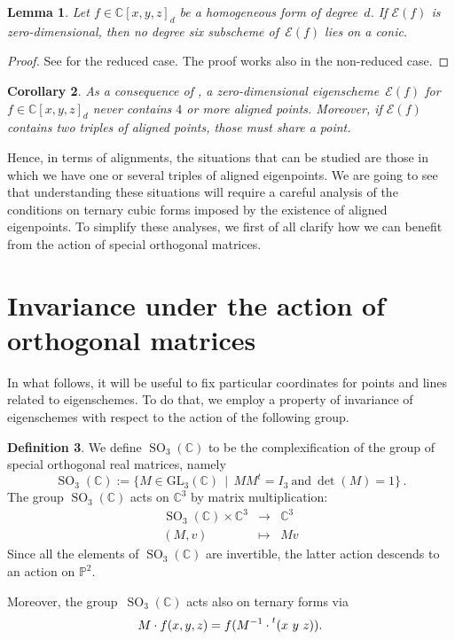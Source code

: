 \documentclass{amsart}
\theoremstyle{plain}
\newtheorem{lemma}{Lemma}[section]
\newtheorem{corollary}[lemma]{Corollary}
\theoremstyle{definition}
\newtheorem{definition}[lemma]{Definition}
\newcommand{\C}{\mathbb{C}}
\newcommand{\p}{\mathbb{P}}
\newcommand{\SO}{\operatorname{SO}}
\newcommand{\Eig}[1]{\mathcal{E}\!\left( {#1} \right)}
\begin{document}
\begin{lemma}
\label{lemma:no_six_conic}
Let $f \in \C[x,y,z]_d$ be a homogeneous form of degree~$d$.
If $\Eig{f}$ is zero-dimensional,
then no degree six subscheme of~$\Eig{f}$ lies on a conic.
\end{lemma}
\begin{proof}
See \cite[Lemma~9.1]{OS1} for the reduced case.
The proof works also in the non-reduced case.
\end{proof}

\begin{corollary}
\label{corollary:general_no_triple}
As a consequence of , a zero-dimensional eigenscheme~$\Eig{f}$ for $f \in \C[x,y,z]_d$ never contains $4$ or more aligned points.
Moreover, if $\Eig{f}$ contains two triples of aligned points, those must share a point.
\end{corollary}

Hence, in terms of alignments, the situations that can be studied are those in which we have one or several triples of aligned eigenpoints.
We are going to see that understanding these situations will require a careful analysis of the conditions on ternary cubic forms imposed by the existence of aligned eigenpoints.
To simplify these analyses, we first of all clarify how we can benefit from the action of special orthogonal matrices.

\section{Invariance under the action of orthogonal matrices}
\label{invariance}

In what follows, it will be useful to fix particular coordinates for points and lines related to eigenschemes. To do that, we employ a property of invariance of eigenschemes with respect to the action of the following group.

\begin{definition}
We define $\SO_3(\C)$ to be the complexification of the group of special orthogonal real matrices, namely
%
\[
  \SO_3(\C) :=
  \bigl\{
    M \in \mathrm{GL}_3(\C) \, \mid \,
    M M^t = I_3 \ \text{and} \ \det(M) = 1
  \bigr\} \,.
\]
%
The group $\SO_3(\C)$ acts on $\C^3$ by matrix multiplication:
%
\[
  \begin{array}{ccc}
    \SO_3(\C) \times \C^3 & \rightarrow & \C^3 \\
    (M, v) & \mapsto & Mv
  \end{array}
\]
%
Since all the elements of $\SO_3(\C)$ are invertible, the latter action descends to an action on $\p^2$.

Moreover, the group~$\SO_3(\C)$ acts also on ternary forms via
%
\[
  M \cdot f (x,y,z) = f(M^{-1} \cdot \prescript{t} {}( x \ y \ z ) ).
\]
%
\end{definition}
\end{document}
